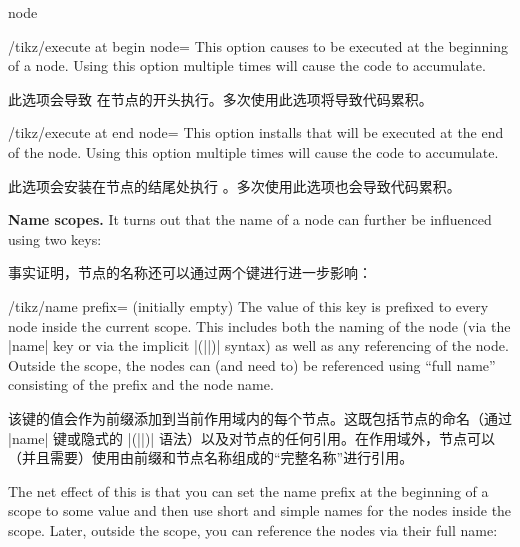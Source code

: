 \begin{pathoperation}{node}
    \begin{key}{/tikz/execute at begin node=}
        This option causes  to be executed at the beginning of a
        node. Using this option multiple times will cause the code to
        accumulate.

        此选项会导致  在节点的开头执行。多次使用此选项将导致代码累积。


    \end{key}

    \begin{key}{/tikz/execute at end node=}
        This option installs  that will be executed at the end of
        the node. Using this option multiple times will cause the code to
        accumulate.
        
        此选项会安装在节点的结尾处执行 。多次使用此选项也会导致代码累积。

\begin{codeexample}[]
\end{codeexample}
    \end{key}

    \medskip
    \textbf{Name scopes.}
    It turns out that the name of a node can further be influenced using two
    keys:
    
    事实证明，节点的名称还可以通过两个键进行进一步影响：

    \begin{key}{/tikz/name prefix= (initially \normalfont empty)}
        The value of this key is prefixed to every node inside the current
        scope. This includes both the naming of the node (via the |name| key or
        via the implicit |(||)| syntax) as well as any referencing
        of the node. Outside the scope, the nodes can (and need to) be
        referenced using ``full name'' consisting of the prefix and the node
        name.

        该键的值会作为前缀添加到当前作用域内的每个节点。这既包括节点的命名（通过 |name| 键或隐式的 |(||)| 语法）以及对节点的任何引用。在作用域外，节点可以（并且需要）使用由前缀和节点名称组成的“完整名称”进行引用。

        The net effect of this is that you can set the name prefix at the
        beginning of a scope to some value and then use short and simple names
        for the nodes inside the scope. Later, outside the scope, you can
        reference the nodes via their full name:
        

\end{key}
\end{pathoperation}
